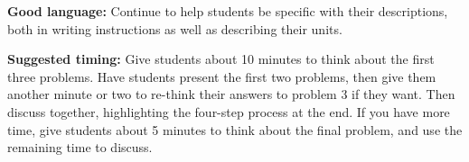 \documentclass[nooutcomes,noauthor]{ximera}
\begin{document}
\begin{instructorNotes}
{\bf Good language:} Continue to help students be specific with their descriptions, both in writing instructions as well as describing their units. 



{\bf Suggested timing:} Give students about 10 minutes to think about the first three problems. Have students present the first two problems, then give them another minute or two to re-think their answers to problem 3 if they want. Then discuss together, highlighting the four-step process at the end. If you have more time, give students about 5 minutes to think about the final problem, and use the remaining time to discuss.



\end{instructorNotes}
\end{document}
